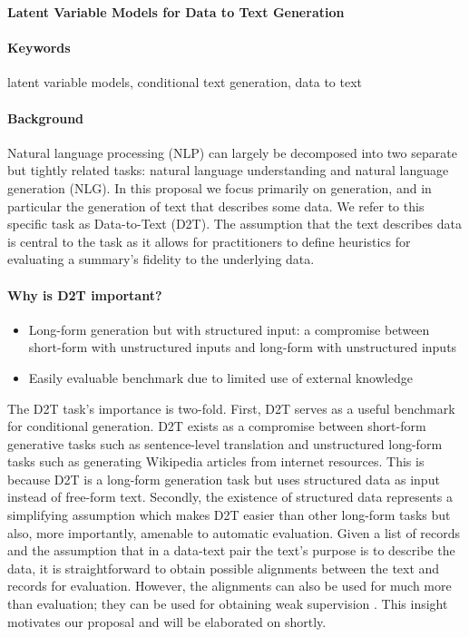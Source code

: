 \documentclass[11pt]{article}
\begin{document}

\begin{center}
\textbf{Latent Variable Models for Data to Text Generation}
\end{center}

\paragraph{Keywords}
latent variable models, conditional text generation, data to text

\paragraph{Background}
Natural language processing (NLP) can largely be decomposed into two separate but
tightly related tasks: natural language understanding and natural language
generation (NLG).
In this proposal we focus primarily on generation, and in particular
the generation of text that describes some data.
We refer to this specific task as Data-to-Text (D2T).
The assumption that the text describes data is central to the task as it allows
for practitioners to define heuristics for evaluating a summary's fidelity to the
underlying data.

\paragraph{Why is D2T important?}
\begin{itemize}
\item Long-form generation but with structured input: a compromise between
short-form with unstructured inputs and long-form with unstructured inputs
\item Easily evaluable benchmark due to limited use of external knowledge
\end{itemize}
The D2T task's importance is two-fold.
First, D2T serves as a useful benchmark for conditional generation.
D2T exists as a compromise between short-form generative tasks such as sentence-level
translation and unstructured long-form tasks such as generating Wikipedia articles
from internet resources.
This is because D2T is a long-form generation task but uses structured data
as input instead of free-form text.
Secondly, the existence of structured data represents a simplifying assumption
which makes D2T easier than other long-form tasks but also, more importantly,
amenable to automatic evaluation.
Given a list of records and the assumption that in a data-text pair the text's purpose
is to describe the data,
it is straightforward to obtain possible alignments between the text and records for evaluation.
However, the alignments can also be used for much more than evaluation; they can be used for
obtaining weak supervision \citep{puduppully2018contentselection}. %
This insight motivates our proposal and will be elaborated on shortly.
\end{document}
